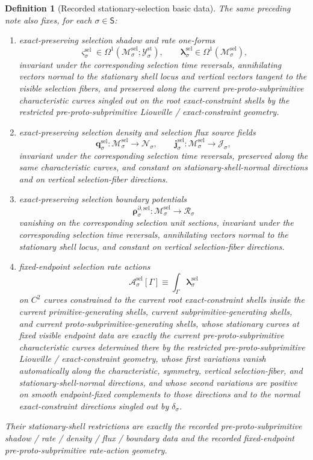 \documentclass[11pt]{article}
\newcommand{\SectorSet}{\mathsf S}
\newcommand{\StatTagClass}[1]{\mathcal Y_{#1}^{\mathrm{st}}}
\newcommand{\DensityClass}[1]{\mathscr N_{#1}}
\newcommand{\FluxClass}[1]{\mathscr J_{#1}}
\newcommand{\PhaseReadClass}[1]{\mathscr R_{#1}}
\newcommand{\ConstraintGap}[1]{\delta_{#1}}
\newcommand{\SelSpace}[1]{\mathcal M_{#1}^{\mathrm{sel}}}
\newcommand{\SelShadowForm}[1]{\boldsymbol{\varsigma}_{#1}^{\mathrm{sel}}}
\newcommand{\SelRateForm}[1]{\boldsymbol{\lambda}_{#1}^{\mathrm{sel}}}
\newcommand{\SelDensitySource}[1]{\boldsymbol{q}_{#1}^{\mathrm{sel}}}
\newcommand{\SelFluxSource}[1]{\boldsymbol{j}_{#1}^{\mathrm{sel}}}
\newcommand{\SelBoundarySource}[1]{\boldsymbol{\rho}_{#1}^{\partial,\mathrm{sel}}}
\newcommand{\SelAction}[1]{\mathscr A_{#1}^{\mathrm{sel}}}
\newtheorem{definition}{Definition}
\begin{document}
\begin{definition}[Recorded stationary-selection basic data]
\label{def:recorded_selection_basic}
The same preceding note also fixes, for each \(\sigma\in\SectorSet\):
\begin{enumerate}
    \item exact-preserving selection shadow and rate one-forms
    \[
    \SelShadowForm{\sigma}\in\Omega^1(\SelSpace{\sigma};\StatTagClass{\sigma}),
    \qquad
    \SelRateForm{\sigma}\in\Omega^1(\SelSpace{\sigma}),
    \]
    invariant under the corresponding selection time reversals, annihilating vectors normal to the stationary shell locus and vertical vectors tangent to the visible selection fibers, and preserved along the current pre-proto-subprimitive characteristic curves singled out on the root exact-constraint shells by the restricted pre-proto-subprimitive Liouville / exact-constraint geometry.
    \item exact-preserving selection density and selection flux source fields
    \[
    \SelDensitySource{\sigma}:\SelSpace{\sigma}\to\DensityClass{\sigma},
    \qquad
    \SelFluxSource{\sigma}:\SelSpace{\sigma}\to\FluxClass{\sigma},
    \]
    invariant under the corresponding selection time reversals, preserved along the same characteristic curves, and constant on stationary-shell-normal directions and on vertical selection-fiber directions.
    \item exact-preserving selection boundary potentials
    \[
    \SelBoundarySource{\sigma}:\SelSpace{\sigma}\to\PhaseReadClass{\sigma}
    \]
    vanishing on the corresponding selection unit sections, invariant under the corresponding selection time reversals, annihilating vectors normal to the stationary shell locus, and constant on vertical selection-fiber directions.
    \item fixed-endpoint selection rate actions
    \begin{equation}
    \SelAction{\sigma}[\Gamma]\equiv \int_\Gamma \SelRateForm{\sigma}
    \label{eq:recorded_selection_action}
    \end{equation}
    on \(C^2\) curves constrained to the current root exact-constraint shells inside the current primitive-generating shells, current subprimitive-generating shells, and current proto-subprimitive-generating shells, whose stationary curves at fixed visible endpoint data are exactly the current pre-proto-subprimitive characteristic curves determined there by the restricted pre-proto-subprimitive Liouville / exact-constraint geometry, whose first variations vanish automatically along the characteristic, symmetry, vertical selection-fiber, and stationary-shell-normal directions, and whose second variations are positive on smooth endpoint-fixed complements to those directions and to the normal exact-constraint directions singled out by \(\ConstraintGap{\sigma}\).
\end{enumerate}
Their stationary-shell restrictions are exactly the recorded pre-proto-subprimitive shadow / rate / density / flux / boundary data and the recorded fixed-endpoint pre-proto-subprimitive rate-action geometry.
\end{definition}
\end{document}
